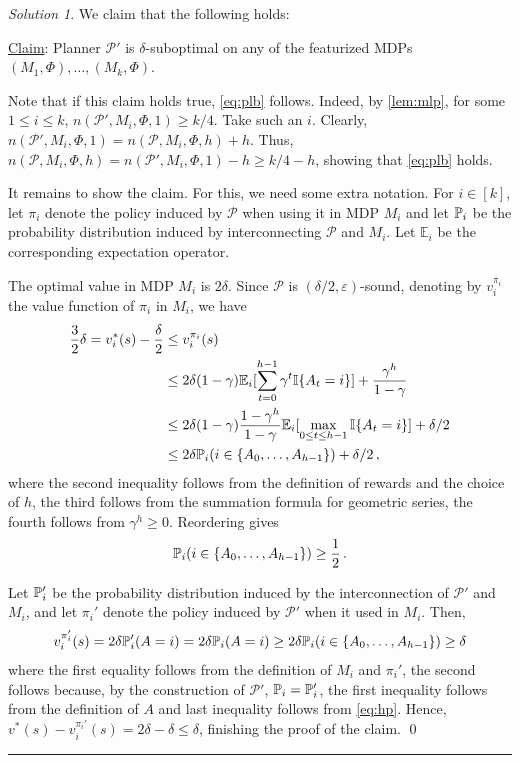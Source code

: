 \documentclass{article}
\newcommand{\cP}{\mathcal{P}}
\newcommand{\E}{\mathbb{E}}
\DeclareMathOperator*{\1}{\mathbbm{1}}
\newcommand{\one}[1]{\mathbb{I}\{#1\}}
\newcommand{\0}{\mathbf{0}}
\theoremstyle{definition}
\theoremstyle{remark}
\newtheorem*{solution*}{Solution}
\theoremstyle{theorem}
\begin{document}
\begin{solution*}
We claim that the following holds:

\noindent \underline{Claim}: Planner $\cP'$ is $\delta$-suboptimal 
on any of the featurized MDPs $(M_1,\Phi),\dots,(M_k,\Phi)$.

Note that if this claim holds true, \cref{eq:plb} follows.
Indeed, by \cref{lem:mlp}, 
for some $1\le i \le k$, $n(\cP',M_i,\Phi,1)\ge k/4$. Take such an $i$.
Clearly, $n(\cP',M_i,\Phi,1) = n(\cP,M_i,\Phi,h)+h$.
Thus, $n(\cP,M_i,\Phi,h)=n(\cP',M_i,\Phi,1)-h \ge k/4-h$, showing that \cref{eq:plb} holds.

It remains to show the claim.
For this, we need some extra notation.
For $i\in [k]$, 
let $\pi_i$ denote the policy induced by $\cP$ when using it in MDP $M_i$
and let $\mathbb{P}_i$ be the probability distribution induced by interconnecting $\cP$ and $M_i$.
Let $\E_i$ be the corresponding expectation operator.

The optimal value in MDP $M_i$ is $2\delta$.
Since $\cP$ is $(\delta/2,\varepsilon)$-sound, denoting by $v_i^{\pi_i}$ the value function of $\pi_i$ in $M_i$, we have
\begin{align*}
\frac{3}{2}\delta = v^*_i(s) - \frac{\delta}{2}  & \le v^{\pi_i}_i(s) \\
& \le 2\delta(1-\gamma) \E_i[ \sum_{t=0}^{h-1}  \gamma^t \one{A_t=i} ]
		+ \frac{\gamma^h}{1-\gamma} \\
&\le  2\delta(1-\gamma) \frac{1-\gamma^{h}}{1-\gamma} \E_i[  \max_{0\le t \le h-1} \one{A_t=i} ]+ \delta/2\\
& \le 2\delta  \PP_i( i\in \{A_0,\dots,A_{h-1}\} )  + \delta/2\,,
\end{align*}
where the second inequality follows from the definition of rewards and the choice of $h$,
the third follows from the summation formula for geometric series, 
the fourth follows from $\gamma^h\ge 0$.
Reordering gives
\begin{align}
 \mathbb{P}_i( i\in \{A_0,\dots,A_{h-1}\} )  \ge \frac{1}{2}\,.
 \label{eq:hp}
\end{align}

Let $\mathbb{P}_i'$ be the probability distribution induced by the interconnection of $\mathcal{P}'$ and $M_i$,
and let $\pi_i'$ denote the policy induced by $\mathcal{P}'$ when it used in $M_i$.
Then,
\begin{align*}
v_i^{\pi_i'} (s)
= 2\delta \mathbb{P}_i'(A=i) 
= 2\delta \mathbb{P}_i(A=i)
\ge 2\delta \mathbb{P}_i(i \in \{A_0,\dots,A_{h-1}\}) \ge \delta
\end{align*}
where the first equality follows from the definition of $M_i$ and $\pi_i'$, the second
follows because, by the construction of $\mathcal{P}'$, $\mathbb{P}_i = \mathbb{P}_i'$, the first inequality follows from the definition of $A$ and last inequality follows from 
\eqref{eq:hp}.
Hence,
$v^*(s)-v_i^{\pi_i'} (s) = 2\delta-\delta \le \delta$, finishing the proof of the claim.
\fi
\qed\par\smallskip\hrule
\end{solution*}
\end{document}
